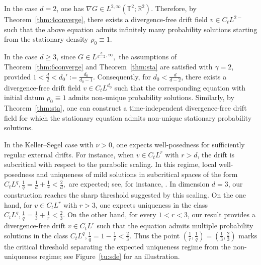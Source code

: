 \documentclass[10pt,a4paper]{amsart}
\numberwithin{equation}{section}
\def\geq{\geqslant}
\def\geq{\geqslant}
\begin{document}
In the case $d=2$, one has
$
\nabla G\in L^{2,\infty}(\mathbb{T}^2;\mathbb{R}^2).
$
Therefore, by Theorem~\ref{thm:4converge}, there exists a divergence-free
drift field
$
v\in C_tL^{2-} 
$
such that the above equation admits infinitely many probability solutions
starting from the stationary density $\rho_0\equiv1$.

In the case $d\geq 3$,   since
$
G\in L^{\frac{d}{d-2},\infty},
$   the assumptions of
Theorem~\ref{thm:6converge} and Theorem~\ref{thm:sta} are satisfied with
$\gamma=2$, provided
$
1<\frac{d}{2}<d_0':=\frac{d_0}{d_0-1}$.
Consequently, for  $d_0<\frac{d}{d-2}$, there exists a
divergence-free drift field
$
v\in C_tL^{d_0} 
$
such that the corresponding equation with initial datum $\rho_0\equiv1$
admits non-unique probability solutions. Similarly, by
Theorem~\ref{thm:sta}, one can construct a time-independent divergence-free
drift field for which the stationary equation admits non-unique stationary
probability solutions.

In the Keller--Segel case with $\nu>0$, one expects well-posedness for
sufficiently regular external drifts. For instance, when
$v\in C_tL^r$ with $r>d$, the drift is
subcritical with respect to the parabolic scaling. In this regime, local
well-posedness and uniqueness of mild solutions in subcritical spaces of the
form $
C_tL^q,
\frac1q=\frac1d+\frac1r<\frac2d,
$
are expected; see, for instance, \cite{Kar99,BHN94}.
In dimension $d=3$, our construction reaches the sharp threshold suggested by
this scaling. On the one hand, for $v\in C_tL^r$ with $r>3$, one expects
uniqueness in the class
$
C_tL^q,
\frac1q=\frac13+\frac1r<\frac23 .
$
On the other hand, for every $1<r<3$, our result provides a divergence-free
drift $
v\in C_tL^r$ 
such that the equation admits multiple probability solutions in the class
$
C_tL^q,
\frac1q=1-\frac1r<\frac23 .
$
Thus the point
$
\left(\frac1r,\frac1q\right)
=
\left(\frac13,\frac23\right)
$
marks the critical threshold separating the expected uniqueness regime from
the non-uniqueness regime; see Figure~\ref{tu:sde} for an illustration.
 
\end{document}
